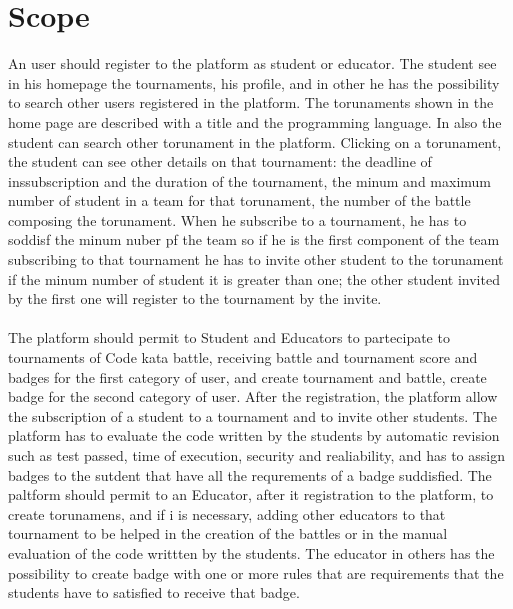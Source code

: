 \documentclass{article}
\begin{document}
\section{Scope}
An user should register to the platform as student or educator. The student see in his homepage the tournaments, his profile, and in other he has the possibility to search other users registered in the platform.
The torunaments shown in the home page are described with a title and the programming language. In also the student can search other torunament in the platform. Clicking on a torunament, the student can see other details on that tournament: the deadline of inssubscription and
the duration of the tournament, the minum and maximum number of student in a team for that torunament, the number of the battle composing the torunament. When he subscribe to a tournament, he has to soddisf the minum nuber pf the team so if he is the first component of the team subscribing to that 
tournament he has to invite other student to the torunament if the minum number of student it is greater than one; the other student invited by the first one will register to the tournament by the invite.
\\
\\
The platform should permit to Student and Educators to partecipate to tournaments of Code kata battle, receiving battle and tournament score and badges for the first category of user, and create tournament and battle, create badge for the second category of user.
After the registration, the platform allow the subscription of a student to a tournament and to invite other students. The platform has to evaluate the code written by the students by automatic revision such as test passed, time of execution, security and realiability, and has to assign badges to the sutdent that have all the requrements of a badge suddisfied.
The paltform should permit to an Educator, after it registration to the platform, to create torunamens, and if i is necessary, adding other educators to that tournament to be helped in the creation of the battles or in the manual evaluation of the code writtten by the students. The educator in others has the possibility to create badge with one or more rules that are 
requirements that the students have to satisfied to receive that badge.
\end{document}
